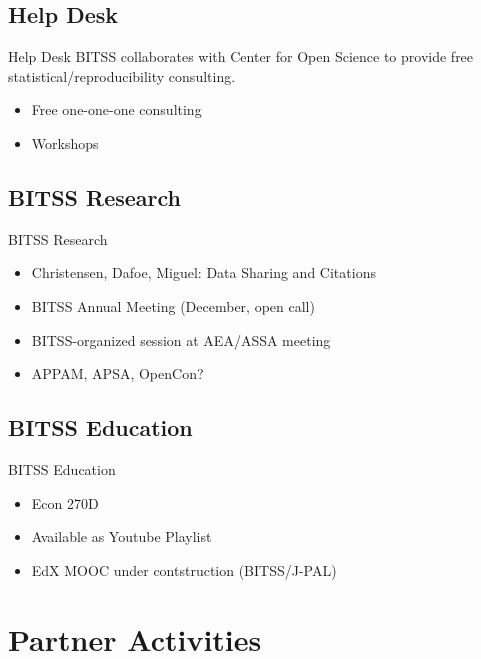 \documentclass{beamer}
\begin{document}
\subsection{Help Desk}
\begin{frame}{Help Desk}
BITSS collaborates with Center for Open Science to provide free statistical/reproducibility consulting. \href{http://centerforopenscience.org/stats_consulting/}{}
\begin{itemize}
\item Free one-one-one consulting
\item Workshops
\end{itemize}
\end{frame}
\subsection{BITSS Research}
\begin{frame}{BITSS Research}
\begin{itemize}
\item Christensen, Dafoe, Miguel: Data Sharing and Citations
\item BITSS Annual Meeting (December, open call)
\item BITSS-organized session at AEA/ASSA meeting
\item APPAM, APSA, OpenCon?
\end{itemize}
\end{frame}
\subsection{BITSS Education}
\begin{frame} {BITSS Education}
\begin{itemize}
\item Econ 270D
\item Available as Youtube Playlist \href{https://www.youtube.com/playlist?list=PL-XXv-cvA_iBN9JZND3CF91aouSHH9ksB}{}
\item EdX MOOC under contstruction (BITSS/J-PAL)
\end{itemize}
\end{frame}
\section{Partner Activities}
\end{document}
